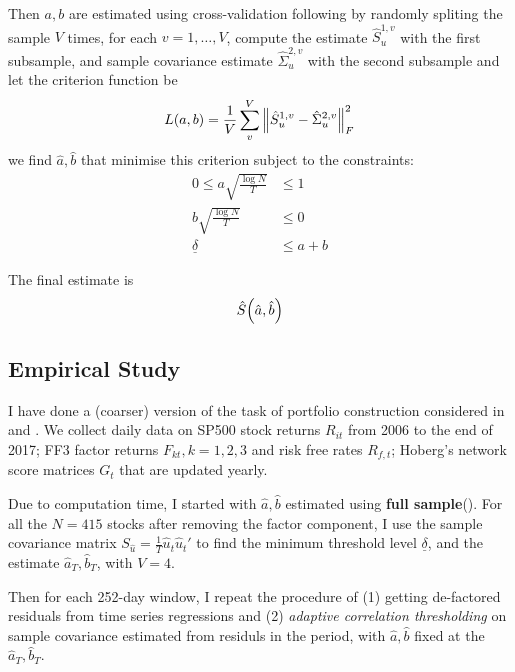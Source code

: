 Then \(a,b\) are estimated using cross-validation following \cite{bickel2008CovarianceRegularization} by randomly spliting the sample \(V\) times, for each \(v = 1,\dots,V\), compute the estimate \(\hat{S}^{1,v}_{u}\) with the first subsample, and sample covariance estimate \(\hat{\Sigma}^{2,v}_{u}\) with the second subsample and let the criterion function be
\begin{equation*}
    L(a, b) = \frac{1}{V} \sum_{v}^{V} \norm{\hat{S}^{1,v}_{u} - \hat{\Sigma}^{2,v}_{u}}^{2}_{F}
\end{equation*}
we find \(\hat{a},\hat{b}\) that minimise this criterion subject to the constraints:
\begin{align}
    0 \leq a \sqrt{\frac{\log N}{T}} &\leq 1 \\
    b \sqrt{\frac{\log N}{T}} &\leq 0 \\
    \underline{\delta} &\leq a + b 
\end{align}

The final estimate is 
\begin{equation*}
    \hat{S}\pqty{\hat{a}, \hat{b}}
\end{equation*}

\subsection{Empirical Study}

I have done a (coarser) version of the task of portfolio construction considered in \cite{ledoit2004HoneyShrunk} and \cite{ledoit2017NonlinearShrinkage}. We collect daily data on SP500 stock returns \(R_{it}\) from 2006 to the end of 2017; FF3 factor returns \(F_{kt}, k =1,2,3\) and risk free rates \(R_{f,t}\); Hoberg's network score matrices \(G_{t}\) that are updated yearly. 

Due to computation time, I started with \(\hat{a},\hat{b}\) estimated using \textbf{full sample}(). For all the \(N = 415\) stocks after removing the factor component, I use the sample covariance matrix \(S_{\hat{u}} = \frac{1}{T} \hat{u}_{t}\hat{u}_{t}'\) to find the minimum threshold level \(\underline{\delta}\), and the estimate \(\hat{a}_{T},\hat{b}_{T}\), with \(V = 4\).

Then for each 252-day window, I repeat the procedure of (1) getting de-factored residuals from time series regressions and (2) \textit{adaptive correlation thresholding} on sample covariance estimated from residuls in the period, with \(\hat{a},\hat{b}\) fixed at the \(\hat{a}_{T}, \hat{b}_{T}\).

